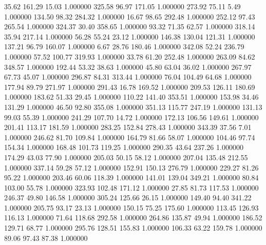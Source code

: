      35.62    161.29     15.03  1.000000
    325.58     96.97    171.05  1.000000
    273.92     75.11      5.49  1.000000
    134.50     98.32    284.32  1.000000
     16.67     98.65    292.48  1.000000
    252.12     97.43    265.54  1.000000
    324.37     30.40    358.65  1.000000
     93.32     71.35     62.57  1.000000
    318.14     35.94    217.14  1.000000
     56.28     55.24     23.12  1.000000
    146.38    130.04    121.31  1.000000
    137.21     96.79    160.07  1.000000
      6.67     28.76    180.46  1.000000
    342.08     52.24    236.79  1.000000
     57.52    100.77    319.93  1.000000
     33.78     61.20    252.48  1.000000
    263.09     84.62    348.57  1.000000
    192.44     53.32     38.63  1.000000
     45.80     63.04     36.02  1.000000
    267.97     67.73     45.07  1.000000
    296.87     84.31    313.44  1.000000
     76.04    104.49     64.68  1.000000
    177.94     89.79    271.97  1.000000
    291.43     16.78    169.52  1.000000
    209.53    126.11    180.69  1.000000
    183.62     51.33     29.45  1.000000
    110.22    141.40    353.51  1.000000
    153.98     34.46    131.29  1.000000
     46.50     92.80    355.08  1.000000
    351.13    115.77    247.19  1.000000
    131.13     99.03     55.39  1.000000
    241.29    107.70     14.72  1.000000
    172.13    106.56    149.61  1.000000
    201.41    113.17    181.59  1.000000
    283.25    152.84    278.43  1.000000
    343.39     37.56      7.01  1.000000
    246.62     81.70    109.84  1.000000
    164.79     81.66     58.07  1.000000
    104.46     97.74    154.34  1.000000
    168.48    101.73    119.25  1.000000
    290.35     43.64    237.26  1.000000
    174.29     43.03     77.90  1.000000
    205.03     50.15     58.12  1.000000
    207.04    135.48    212.55  1.000000
    337.14     59.28     57.12  1.000000
    152.91    150.13    276.79  1.000000
    229.27     81.26     95.22  1.000000
    203.46     60.06    118.39  1.000000
    141.01    139.04    349.21  1.000000
     80.84    103.00     55.78  1.000000
    323.93    102.48    171.12  1.000000
     27.85     81.73    117.53  1.000000
    246.37     49.80    146.58  1.000000
    305.24    125.66     26.15  1.000000
    149.40     94.40    341.22  1.000000
    205.75     93.17     23.13  1.000000
    150.15     75.25    175.60  1.000000
    113.45    126.93    116.13  1.000000
     71.64    118.68    292.58  1.000000
    264.86    135.87     49.94  1.000000
    186.52    129.71     68.77  1.000000
    295.76    128.51    155.83  1.000000
    106.33     63.22    159.78  1.000000
     89.06     97.43     87.38  1.000000
